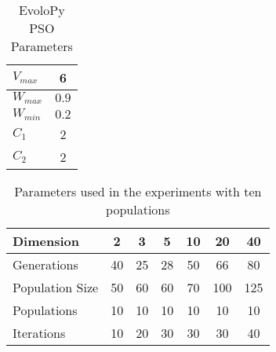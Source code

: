   \begin{table}
    \small
    \caption{ EvoloPy PSO Parameters }
    \label{tab:PSOparams} 
    \centering
    \small
    \begin{tabular}{|l|c|}
      \hline
      $V_{max}$ & 6 \\ \hline
      $W_{max}$ & $0.9$ \\ \hline
      $W_{min}$ & $0.2$ \\ \hline
      $C_1$ & 2 \\ \hline
      $C_2$ & 2 \\ \hline
    \end{tabular}
  \end{table}


  \begin{table}
    \small
    \caption{Parameters used in the experiments with ten populations
    }
    \label{tab:params:10}
    \vspace{0.25cm}
    \centering
    \small
    \begin{tabular}{|l|c|c|c|c|c|c|}
      \hline
      Dimension        & 2  & 3  & 5  & 10 & 20  & 40  \\ \hline
      Generations      & 40 & 25 & 28 & 50 & 66  & 80  \\ \hline
      Population Size  & 50 & 60 & 60 & 70 & 100 & 125 \\ \hline
      Populations      & 10 & 10 & 10 & 10 & 10  & 10  \\ \hline
      Iterations       & 10 & 20 & 30 & 30 & 30  & 40  \\ \hline  
    \end{tabular}
\end{table}





